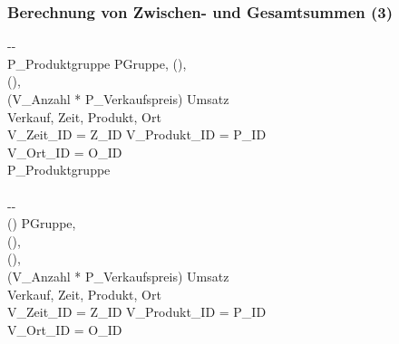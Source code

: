     
    
    
    \begin{frame}[shrink=10]
    \frametitle{Berechnung von Zwischen- und Gesamtsummen (3)}
    
    \begin{sql}
    -{}-  \\
      P\_Produktgruppe   PGruppe, (), \\
    \1 (), \\
    \1 (V\_Anzahl * P\_Verkaufspreis)  Umsatz  \\
      Verkauf, Zeit, Produkt, Ort \\
     V\_Zeit\_ID = Z\_ID  V\_Produkt\_ID = P\_ID  \\
    \1 V\_Ort\_ID = O\_ID \\
     P\_Produktgruppe  \\
       \\
    -{}-  \\
      ()   PGruppe, \\
    \1 (), \\
    \1 (), \\
    \1 (V\_Anzahl * P\_Verkaufspreis)  Umsatz  \\
      Verkauf, Zeit, Produkt, Ort \\
      V\_Zeit\_ID = Z\_ID  V\_Produkt\_ID = P\_ID  \\
    \1 V\_Ort\_ID = O\_ID
     \end{sql}
    
    \end{frame}
    
    
